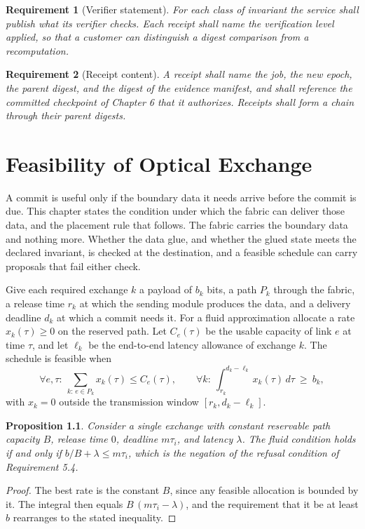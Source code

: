 \documentclass[11pt,openany]{book}
\newtheorem{proposition}{Proposition}[chapter]
\newtheorem{requirement}{Requirement}[chapter]
\theoremstyle{remark}
\begin{document}
\begin{requirement}[Verifier statement]
For each class of invariant the service shall publish what its verifier checks. Each receipt shall name the verification level applied, so that a customer can distinguish a digest comparison from a recomputation.
\end{requirement}

\begin{requirement}[Receipt content]
A receipt shall name the job, the new epoch, the parent digest, and the digest of the evidence manifest, and shall reference the committed checkpoint of Chapter 6 that it authorizes. Receipts shall form a chain through their parent digests.
\end{requirement}

\chapter{Feasibility of Optical Exchange}

A commit is useful only if the boundary data it needs arrive before the commit is due. This chapter states the condition under which the fabric can deliver those data, and the placement rule that follows. The fabric carries the boundary data and nothing more. Whether the data glue, and whether the glued state meets the declared invariant, is checked at the destination, and a feasible schedule can carry proposals that fail either check.

Give each required exchange $k$ a payload of $b_k$ bits, a path $P_k$ through the fabric, a release time $r_k$ at which the sending module produces the data, and a delivery deadline $d_k$ at which a commit needs it. For a fluid approximation allocate a rate $x_k(\tau)\ge0$ on the reserved path. Let $C_e(\tau)$ be the usable capacity of link $e$ at time $\tau$, and let $\ell_k$ be the end-to-end latency allowance of exchange $k$. The schedule is feasible when
\[
\forall e,\tau:\ \sum_{k:\,e\in P_k}x_k(\tau)\le C_e(\tau),
\qquad
\forall k:\ \int_{r_k}^{d_k-\ell_k}x_k(\tau)\,d\tau\ \ge\ b_k,
\]
with $x_k=0$ outside the transmission window $[r_k,d_k-\ell_k]$.

\begin{proposition}\label{prop:special}
Consider a single exchange with constant reservable path capacity $B$, release time $0$, deadline $m\tau_i$, and latency $\lambda$. The fluid condition holds if and only if $b/B+\lambda\le m\tau_i$, which is the negation of the refusal condition of Requirement 5.4.
\end{proposition}
\begin{proof}
The best rate is the constant $B$, since any feasible allocation is bounded by it. The integral then equals $B\,(m\tau_i-\lambda)$, and the requirement that it be at least $b$ rearranges to the stated inequality.
\end{proof}
\end{document}
